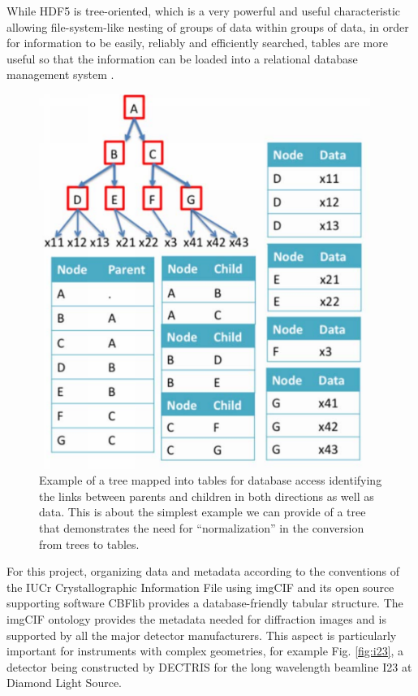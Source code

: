 \documentclass[11pt]{a0poster}
\begin{document}
\begin{minipage}[]{0.29\linewidth}
While HDF5 is tree-oriented, which is a very powerful and useful
characteristic allowing file-system-like nesting of groups of data
within groups of data, in order for information to be
easily, reliably and efficiently searched, tables are more useful 
so that the information can be loaded into a relational database
management system \cite{Codd1970}. 


\begin{figure}
\begin{center}
\includegraphics[width=4.25in]{Tree_Example2}
\caption{\fontsize{16}{20}\selectfont %
Example of a tree mapped into tables for database access identifying the links between
parents and children in both directions as well as data.  This is about the simplest example
we can provide of a tree that demonstrates the need for ``normalization'' in the conversion
from trees to tables.}
\label{fig:Tree_Example}
\end{center}
\end{figure}

For this project, organizing data and metadata according to the
conventions of the IUCr Crystallographic Information File
\cite{Hall1991} using imgCIF \cite{imgCIF} and its open source
supporting software CBFlib \cite{CBFlib2005} provides a
database-friendly tabular structure.  The imgCIF ontology provides the
metadata needed for diffraction images and is supported by all the
major detector manufacturers. This aspect is particularly important
for instruments with complex geometries, for example Fig. {\ref{fig:i23}}, a
detector being constructed by DECTRIS for the long wavelength beamline
I23 at Diamond Light Source. 



\end{minipage}
\end{document}
